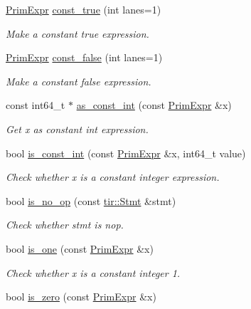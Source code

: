 \begin{DoxyCompactItemize}
\hyperlink{classtvm_1_1PrimExpr}{Prim\+Expr} \hyperlink{namespacetvm_1_1tir_ac40c127b53bca09d4c39f806a98dfdf8}{const\+\_\+true} (int lanes=1)
\begin{DoxyCompactList}\small\item\em Make a constant true expression. \end{DoxyCompactList}\item 
\hyperlink{classtvm_1_1PrimExpr}{Prim\+Expr} \hyperlink{namespacetvm_1_1tir_ae11cb5c6f810546e5aa4e08a0684071a}{const\+\_\+false} (int lanes=1)
\begin{DoxyCompactList}\small\item\em Make a constant false expression. \end{DoxyCompactList}\item 
const int64\+\_\+t $\ast$ \hyperlink{namespacetvm_1_1tir_acbe8f225faaf34c540194921a7ee6a66}{as\+\_\+const\+\_\+int} (const \hyperlink{classtvm_1_1PrimExpr}{Prim\+Expr} \&x)
\begin{DoxyCompactList}\small\item\em Get x as constant int expression. \end{DoxyCompactList}\item 
bool \hyperlink{namespacetvm_1_1tir_a5c414d5e54c099ad7287be302aac8f02}{is\+\_\+const\+\_\+int} (const \hyperlink{classtvm_1_1PrimExpr}{Prim\+Expr} \&x, int64\+\_\+t value)
\begin{DoxyCompactList}\small\item\em Check whether x is a constant integer expression. \end{DoxyCompactList}\item 
bool \hyperlink{namespacetvm_1_1tir_a8de8f843c6eb433b6ddfbf34e24099ef}{is\+\_\+no\+\_\+op} (const \hyperlink{classtvm_1_1tir_1_1Stmt}{tir\+::\+Stmt} \&stmt)
\begin{DoxyCompactList}\small\item\em Check whether stmt is nop. \end{DoxyCompactList}\item 
bool \hyperlink{namespacetvm_1_1tir_a9b5104dcf0933da31329bb0b2580a947}{is\+\_\+one} (const \hyperlink{classtvm_1_1PrimExpr}{Prim\+Expr} \&x)
\begin{DoxyCompactList}\small\item\em Check whether x is a constant integer 1. \end{DoxyCompactList}\item 
bool \hyperlink{namespacetvm_1_1tir_a48bad3db162b334837716bf8e7ba9285}{is\+\_\+zero} (const \hyperlink{classtvm_1_1PrimExpr}{Prim\+Expr} \&x)

\end{DoxyCompactItemize}
